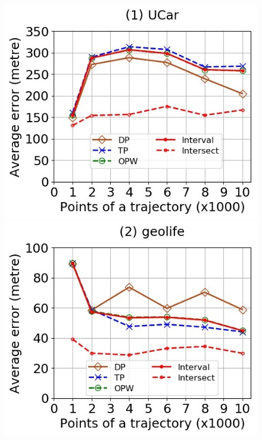 \begin{figure}[tb!]
	\centering
	\includegraphics[scale=0.400]{Figures/Exp-when-DAD-error-size-service.jpg}	\hspace{2ex}
	\includegraphics[scale=0.400]{Figures/Exp-when-DAD-error-size-geolife.jpg}	\hspace{2ex}

\end{figure}
